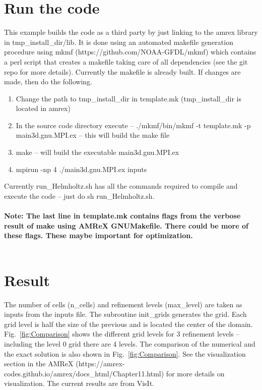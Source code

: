 \documentclass[]{article}
\begin{document}
\section{Run the code}
This example builds the code as a third party by just linking to the amrex library in tmp\_install\_dir/lib. It is done using an automated makefile generation procedure using mkmf (https://github.com/NOAA-GFDL/mkmf) which contains a perl script that creates a makefile taking care of all dependencies (see the git repo for more details). Currently the makefile is already built. If changes are made, then do the following.
\begin{enumerate}
\item Change the path to tmp\_install\_dir in template.mk (tmp\_install\_dir is located in amrex)
\item In the source code directory execute -- ./mkmf/bin/mkmf -t template.mk -p main3d.gnu.MPI.ex -- this will build the make file
\item make -- will build the executable main3d.gnu.MPI.ex
\item mpirun -np 4 ./main3d.gnu.MPI.ex inputs
\end{enumerate}
Currently run\_Helmholtz.sh has all the commands required to compile and execute the code -- just do sh run\_Helmholtz.sh.\\\\
\textbf{Note: The last line in template.mk contains flags from the verbose result of make using AMReX GNUMakefile. There could be more of these flags. These maybe important for optimization.}\\\\

\section{Result}
The number of cells (n\_cells) and refinement levels (max\_level) are taken as inputs from the inputs file. The subroutine init\_grids generates the grid. Each grid level is half the size of the previous and is located the center of the domain. Fig.~\ref{fig:Comparison} shows the different grid levels for 3 refinement levels -- including the level 0 grid there are 4 levels. The comparison of the numerical and the exact solution is also shown in Fig.~\ref{fig:Comparison}. See the visualization section in the AMReX (https://amrex-codes.github.io/amrex/docs\_html/Chapter11.html) for more details on visualization. The current results are from VisIt.
\end{document}

